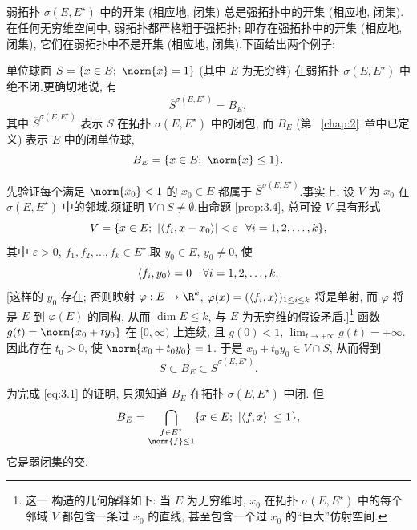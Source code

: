 \begin{remark}
\label{rem:3.2}
弱拓扑 $\sigma(E,E^\star)$ 中的开集 (相应地, 闭集) 总是强拓扑中的开集 (相应地,
闭集).在任何无穷维空间中, 弱拓扑都严格粗于强拓扑; 即存在强拓扑中的开集
(相应地, 闭集), 它们在弱拓扑中不是开集 (相应地, 闭集).下面给出两个例子:
\end{remark}

\begin{example}
\label{exa:3.1}
单位球面 $S=\{x\in E;\ \norm{x}=1\}$ (其中 $E$ 为无穷维) 在弱拓扑
$\sigma(E,E^\star)$ 中绝不闭.更确切地说, 有
\begin{equation}
\overline{S}^{\sigma(E,E^\star)}=B_E,
\label{eq:3.1}
\end{equation}
其中 $\overline{S}^{\sigma(E,E^\star)}$ 表示 $S$ 在拓扑 $\sigma(E,E^\star)$ 中的闭包,
而 $B_E$ (第~
\ref{chap:2}~章中已定义) 表示 $E$ 中的闭单位球,
\begin{equation*}
B_E=\{x\in E;\ \norm{x}\le1\}.
\end{equation*}

先验证每个满足 $\norm{x_0}<1$ 的 $x_0\in E$ 都属于
$\overline{S}^{\sigma(E,E^\star)}$.事实上, 设 $V$ 为 $x_0$ 在
$\sigma(E,E^\star)$ 中的邻域.须证明 $V\cap S\ne\emptyset$.由命题  \ref{prop:3.4},
总可设 $V$ 具有形式
\begin{equation*}
V=\{x\in E;\ \abs{\dual{f_i}{x-x_0}}<\varepsilon\ \ \forall i=1,2,\dots,k\},
\end{equation*}
其中 $\varepsilon>0$, $f_1,f_2,\dots,f_k\in E^\star$.取 $y_0\in E$, $y_0\ne0$, 使
\begin{equation*}
\left\langle f_i,y_0\right\rangle=0\quad\forall i=1,2,\dots,k.
\end{equation*}
[这样的 $y_0$ 存在; 否则映射 $\varphi:E\to\R^k$,
$\varphi(x)=(\left\langle f_i,x\right\rangle)_{1\le i\le k}$ 将是单射, 而 $\varphi$ 将是 $E$ 到
$\varphi(E)$ 的同构, 从而 $\dim E\le k$, 与 $E$ 为无穷维的假设矛盾.]\footnote{这一
构造的几何解释如下: 当 $E$ 为无穷维时, $x_0$ 在拓扑 $\sigma(E,E^\star)$ 中的每个
邻域 $V$ 都包含一条过 $x_0$ 的直线, 甚至包含一个过 $x_0$ 的``巨大''仿射空间.}
函数 $g(t)=\norm{x_0+ty_0}$ 在 $[0,\infty)$ 上连续, 且 $g(0)<1$,
$\lim_{t\to+\infty}g(t)=+\infty$.因此存在 $t_0>0$, 使 $\norm{x_0+t_0y_0}=1$.
于是 $x_0+t_0y_0\in V\cap S$, 从而得到
\begin{equation*}
S\subset B_E\subset\overline{S}^{\sigma(E,E^\star)}.
\end{equation*}

为完成 \eqref{eq:3.1} 的证明, 只须知道 $B_E$ 在拓扑 $\sigma(E,E^\star)$ 中闭.
但
\begin{equation*}
B_E=\bigcap_{\substack{f\in E^\star\\ \norm{f}\le1}}\{x\in E;\ \abs{\dual{f}{x}}\le1\},
\end{equation*}
它是弱闭集的交.
\end{example}

